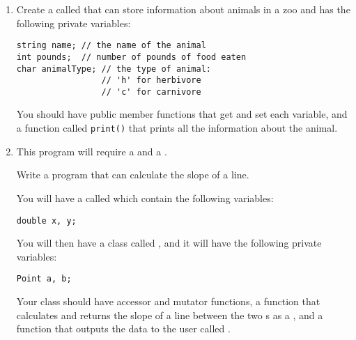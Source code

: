\begin{enumerate}
\item Create a  called  that can store information about animals in a zoo and has the following private variables: \nopagebreak[4]

\noindent\begin{minipage}{\linewidth}\begin{lstlisting}
string name; // the name of the animal
int pounds;  // number of pounds of food eaten
char animalType; // the type of animal: 
                 // 'h' for herbivore
                 // 'c' for carnivore
\end{lstlisting}\end{minipage}

You should have public member functions that get and set each variable, and a function called \texttt{print()} that prints all the information about the animal.

\item This program will require a  and a .

Write a program that can calculate the slope of a line.

You will have a  called  which contain the following variables:

\noindent\begin{minipage}{\linewidth}\begin{lstlisting}
double x, y;
\end{lstlisting}\end{minipage}

You will then have a class called , and it will have the following private variables:

\noindent\begin{minipage}{\linewidth}\begin{lstlisting}
Point a, b;
\end{lstlisting}\end{minipage}

Your class should have accessor and mutator functions, a function that calculates and returns the slope of a line between the two s as a , and a function that outputs the data to the user called .
\end{enumerate}


